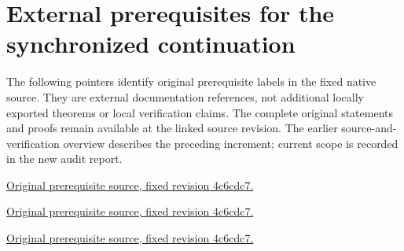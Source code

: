 \section{External prerequisites for the synchronized continuation}
\label{sec:external-prerequisites-20261021}
The following pointers identify original prerequisite labels in the fixed native source.
They are external documentation references, not additional locally exported theorems or local verification claims.
The complete original statements and proofs remain available at the linked source revision.
The earlier source-and-verification overview describes the preceding increment; current scope is recorded in the new audit report.
\par\medskip\noindent\texttt{}\par
\label{ana:analytic-noether}
\label{ana:analytic-preimage}
\label{ana:blowup-existence}
\label{ana:blowups}
\label{ana:cartan-coherence}
\label{ana:geometric-setting}
\label{ana:local-holomorphic-inverse}
\label{ana:nonkahler-locus}
\label{ana:regular-component}
\label{ana:regular-transport}
\label{ana:strict-transform-blowup}
\label{ana:strict-transform-composition}
\label{ana:strict-transform-sequence}
\href{https://github.com/MingchenXia/archon-nakamaye/blob/4c6cdc79e7f8e506fb4b9a820c0a7b2946ad2a07/TranscendentalNakamaye/blueprint/src/analytic.tex}{Original prerequisite source, fixed revision 4c6cdc7.}\par
\par\medskip\noindent\texttt{}\par
\label{bex:hadamard}
\href{https://github.com/MingchenXia/archon-nakamaye/blob/4c6cdc79e7f8e506fb4b9a820c0a7b2946ad2a07/TranscendentalNakamaye/blueprint/src/blowup-existence.tex}{Original prerequisite source, fixed revision 4c6cdc7.}\par
\par\medskip\noindent\texttt{}\par
\label{fpgeom:complex-analytic-subvariety}
\href{https://github.com/MingchenXia/archon-nakamaye/blob/4c6cdc79e7f8e506fb4b9a820c0a7b2946ad2a07/TranscendentalNakamaye/blueprint/src/first-pass-geometry.tex}{Original prerequisite source, fixed revision 4c6cdc7.}\par
\par\medskip\noindent\texttt{}\par
\label{hir:real-domain-actual-ideal-module-presheaf-stalk-action}
